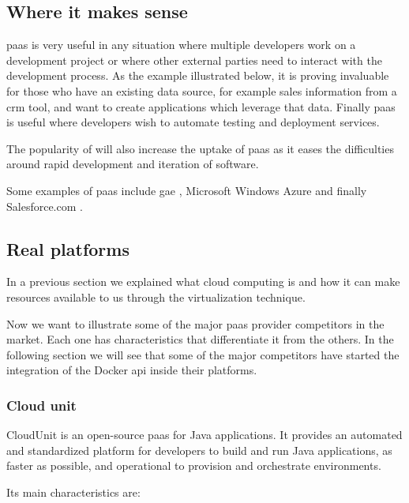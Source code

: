 \subsection{Where it makes sense}
\label{sec:background-paas-whereToUse}
\ac{paas} is very useful in any situation where multiple developers work on a development project or
where other external parties need to interact with the development process. As the example illustrated
below, it is proving invaluable for those who have an existing data source, for example sales information
from a \ac{crm} tool, and want to create applications which leverage that data. Finally \ac{paas} is useful
where developers wish to automate testing and deployment services.

The popularity of  will also increase the uptake of \ac{paas} as it eases the
difficulties around rapid development and iteration of software.

Some examples of \ac{paas} include \ac{gae} \cite{googleAppEngine}, Microsoft Windows Azure
\cite{windowsAzure} and finally Salesforce.com \cite{salesforcePlatform}.

\subsection{Real platforms}
\label{sec:background-paas-platforms}
In a previous section we explained what cloud computing is and how it can make resources
available to us through the virtualization technique. 

Now we want to illustrate some of the major \ac{paas} provider competitors in the market. Each one 
has characteristics that differentiate it from the others. In the following section we will see that
some of the major competitors have started the integration of the Docker \acs{api} inside their platforms.

\subsubsection{Cloud unit}
\label{sec:background-paas-platforms-cloudUnit}
CloudUnit \cite{cloudUnitHomepage} is an open-source \ac{paas} for Java applications. It provides an
automated and standardized platform for developers to build and run Java applications, as faster as
possible, and operational to provision and orchestrate environments.

Its main characteristics are:

